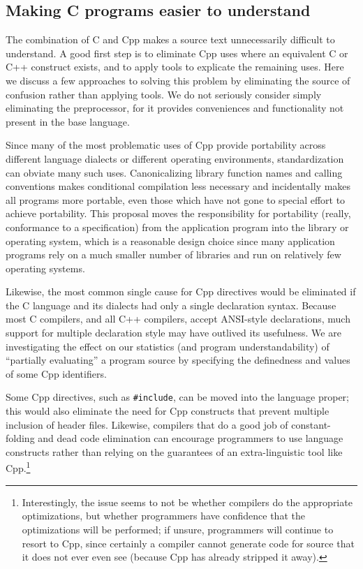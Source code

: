 \documentclass[11pt]{article}
\begin{document}
\subsection{Making C programs easier to understand}

The combination of C and Cpp makes a source text unnecessarily difficult to
understand.  A good first step is to eliminate Cpp uses where an equivalent
C or C++ construct exists, and to apply tools to explicate the remaining
uses.  Here we discuss a few approaches to solving this problem by
eliminating the source of confusion rather than applying tools.  We do not
seriously consider simply eliminating the preprocessor, for it provides
conveniences and functionality not present in the base language.

Since many of the most problematic uses of Cpp provide portability across
different language dialects or different operating environments,
standardization can obviate many such uses.  Canonicalizing library
function names and calling conventions makes conditional compilation less
necessary and incidentally makes all programs more portable, even those
which have not gone to special effort to achieve portability.  This
proposal moves the responsibility for portability (really, conformance to a
specification) from the application program into the library or operating
system, which is a reasonable design choice since many application programs
rely on a much smaller number of libraries and run on relatively few
operating systems.

Likewise, the most common single cause for Cpp directives would be
eliminated if the C language and its dialects had only a single declaration
syntax.  Because most C compilers, and all C++ compilers, accept ANSI-style
declarations, much support for multiple declaration style may have outlived
its usefulness.  We are investigating the effect on our statistics (and
program understandability) of ``partially evaluating'' a program source by
specifying the definedness and values of some Cpp identifiers.

Some Cpp directives, such as {\tt \#include}, can be moved into the
language proper; this would also eliminate the need for Cpp constructs that
prevent multiple inclusion of header files.  Likewise, compilers that do a
good job of constant-folding and dead code elimination can encourage
programmers to use language constructs rather than relying on the
guarantees of an extra-linguistic tool like Cpp.\footnote{Interestingly,
  the issue seems to not be whether compilers do the appropriate
  optimizations, but whether programmers have confidence that the
  optimizations will be performed; if unsure, programmers will continue to
  resort to Cpp, since certainly a compiler cannot generate code for source
  that it does not ever even see (because Cpp has already stripped it
  away).}
\end{document}
